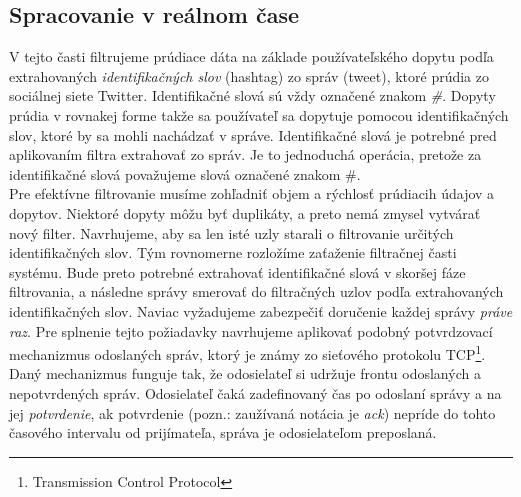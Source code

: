 \subsection{Spracovanie v reálnom čase}
V tejto časti filtrujeme prúdiace dáta na základe používateľského dopytu podľa extrahovaných \textit{identifikačných slov} (hashtag) zo správ (tweet), ktoré prúdia zo sociálnej siete Twitter. Identifikačné slová sú vždy označené znakom \textit{\#}. Dopyty prúdia v rovnakej forme takže sa používateľ sa dopytuje pomocou identifikačných slov, ktoré by sa mohli nachádzať v správe. Identifikačné slová je potrebné pred aplikovaním filtra extrahovať zo správ. Je to jednoduchá operácia, pretože za identifikačné slová považujeme slová označené znakom \#. 
\\[5pt]
Pre efektívne filtrovanie musíme zohľadniť objem a rýchlosť prúdiacih údajov a dopytov. Niektoré dopyty môžu byť duplikáty, a preto nemá zmysel vytvárať nový filter. Navrhujeme, aby sa len isté uzly starali o filtrovanie určitých identifikačných slov. Tým rovnomerne rozložíme zaťaženie filtračnej časti systému. Bude preto potrebné extrahovať identifikačné slová v skoršej fáze filtrovania, a následne správy smerovať do filtračných uzlov podľa extrahovaných identifikačných slov. Naviac vyžadujeme zabezpečiť doručenie každej správy \textit{práve raz}. Pre splnenie tejto požiadavky navrhujeme aplikovať  podobný potvrdzovací mechanizmus odoslaných správ, ktorý je známy zo sieťového protokolu TCP\footnote{Transmission Control Protocol}. 
Daný mechanizmus funguje tak, že odosielateľ si udržuje frontu odoslaných a nepotvrdených správ. Odosielateľ čaká zadefinovaný čas po odoslaní správy a na jej \textit{potvrdenie}, ak potvrdenie (pozn.: zaužívaná notácia je \textit{ack}) nepríde do tohto časového intervalu od prijímateľa, správa je odosielateľom preposlaná. 


